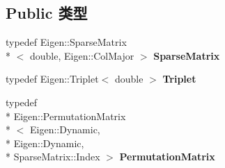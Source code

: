 \subsection*{Public 类型}
\begin{DoxyCompactItemize}
\item 
\hypertarget{classg2o_1_1LinearSolverEigen_aeb7e2400bed3a249b5f29ce7cc00cd33}{typedef Eigen\-::\-Sparse\-Matrix\\*
$<$ double, Eigen\-::\-Col\-Major $>$ {\bfseries Sparse\-Matrix}}\label{classg2o_1_1LinearSolverEigen_aeb7e2400bed3a249b5f29ce7cc00cd33}

\item 
\hypertarget{classg2o_1_1LinearSolverEigen_a602c24e05d2f46022aa1827fdbc45638}{typedef Eigen\-::\-Triplet$<$ double $>$ {\bfseries Triplet}}\label{classg2o_1_1LinearSolverEigen_a602c24e05d2f46022aa1827fdbc45638}

\item 
\hypertarget{classg2o_1_1LinearSolverEigen_acd9dd4e15dfbbad2720f1b83519333e8}{typedef \\*
Eigen\-::\-Permutation\-Matrix\\*
$<$ Eigen\-::\-Dynamic, \\*
Eigen\-::\-Dynamic, \\*
Sparse\-Matrix\-::\-Index $>$ {\bfseries Permutation\-Matrix}}\label{classg2o_1_1LinearSolverEigen_acd9dd4e15dfbbad2720f1b83519333e8}

\end{DoxyCompactItemize}
